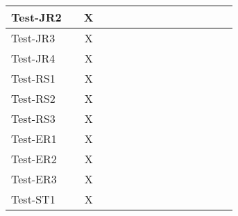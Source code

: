 \documentclass[12pt, titlepage]{article}
\begin{document}
\begin{table}[H]
\begin{adjustwidth}{-0.3in}{-0.5in}
{\begin{tabular}{c|c|c|c|c|c|c|c|c|c|c|c|c|c|c|}
\multicolumn{1}{|l|}{{Test-JR2}}   &             &       X      &             &             &             &             &             &             &              &              &              &             &  &                    \\ \hline
\multicolumn{1}{|l|}{{Test-JR3}}   &             &       X      &             &             &             &             &             &             &              &              &              &             &  &                    \\ \hline
\multicolumn{1}{|l|}{{Test-JR4}}   &             &       X      &             &             &             &             &             &             &              &              &              &             &  &                    \\ \hline
\multicolumn{1}{|l|}{{Test-RS1}}   &             &      X       &             &             &             &             &             &             &              &              &              &             &  &                    \\ \hline
\multicolumn{1}{|l|}{{Test-RS2}}   &             &      X       &             &             &             &             &             &             &              &              &              &             &  &                    \\ \hline
\multicolumn{1}{|l|}{{Test-RS3}}   &             &       X      &             &             &             &             &             &             &              &              &              &             &  &                    \\ \hline
\multicolumn{1}{|l|}{{Test-ER1}}   &             &       X      &             &             &             &             &             &             &              &              &              &             &  &                    \\ \hline
\multicolumn{1}{|l|}{{Test-ER2}}   &             &       X      &             &             &             &             &             &             &              &              &              &             &  &                    \\ \hline
\multicolumn{1}{|l|}{{Test-ER3}}   &             &       X      &             &             &             &             &             &             &              &              &              &             &  &                    \\ \hline
\multicolumn{1}{|l|}{{Test-ST1}}   &             &       X      &             &             &             &             &             &             &              &              &              &             &  &                    \\ \hline

\end{tabular}}
\end{adjustwidth}
\end{table}
\end{document}

